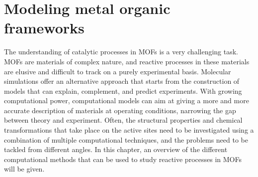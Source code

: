 \graphicspath{{figures/chapter2/}}
\renewcommand\evenpagerightmark{{\scshape\small Modeling metal organic frameworks}} 
\renewcommand\oddpageleftmark{{\scshape\small Chapter 2}}


\hyphenation{}

\chapter[Modeling metal organic frameworks]%
{Modeling metal organic frameworks}
\label{ch2}
%


The understanding of catalytic processes in MOFs is a very challenging task. MOFs are materials of complex nature, and reactive processes in these materials are elusive and difficult to track on a purely experimental basis. Molecular simulations offer an alternative approach that starts from the construction of models that can explain, complement, and predict experiments. With growing computational power, computational models can aim at giving a more and more accurate description of materials at operating conditions, narrowing the gap between theory and experiment. Often, the structural properties and chemical transformations that take place on the active sites need to be investigated using a combination of multiple computational techniques, and the problems need to be tackled from different angles. 
In this chapter, an overview of the different computational methods that can be used to study reactive processes in MOFs will be given. 

